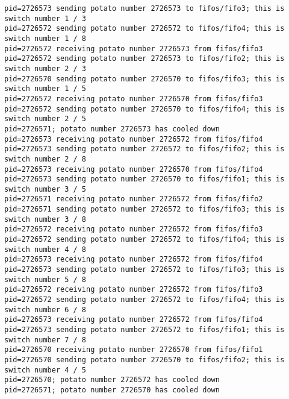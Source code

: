 \documentclass[a4paper]{article}
\begin{document}
\begin{verbatim}
pid=2726573 sending potato number 2726573 to fifos/fifo3; this is switch number 1 / 3
pid=2726572 sending potato number 2726572 to fifos/fifo4; this is switch number 1 / 8
pid=2726572 receiving potato number 2726573 from fifos/fifo3
pid=2726572 sending potato number 2726573 to fifos/fifo2; this is switch number 2 / 3
pid=2726570 sending potato number 2726570 to fifos/fifo3; this is switch number 1 / 5
pid=2726572 receiving potato number 2726570 from fifos/fifo3
pid=2726572 sending potato number 2726570 to fifos/fifo4; this is switch number 2 / 5
pid=2726571; potato number 2726573 has cooled down
pid=2726573 receiving potato number 2726572 from fifos/fifo4
pid=2726573 sending potato number 2726572 to fifos/fifo2; this is switch number 2 / 8
pid=2726573 receiving potato number 2726570 from fifos/fifo4
pid=2726573 sending potato number 2726570 to fifos/fifo1; this is switch number 3 / 5
pid=2726571 receiving potato number 2726572 from fifos/fifo2
pid=2726571 sending potato number 2726572 to fifos/fifo3; this is switch number 3 / 8
pid=2726572 receiving potato number 2726572 from fifos/fifo3
pid=2726572 sending potato number 2726572 to fifos/fifo4; this is switch number 4 / 8
pid=2726573 receiving potato number 2726572 from fifos/fifo4
pid=2726573 sending potato number 2726572 to fifos/fifo3; this is switch number 5 / 8
pid=2726572 receiving potato number 2726572 from fifos/fifo3
pid=2726572 sending potato number 2726572 to fifos/fifo4; this is switch number 6 / 8
pid=2726573 receiving potato number 2726572 from fifos/fifo4
pid=2726573 sending potato number 2726572 to fifos/fifo1; this is switch number 7 / 8
pid=2726570 receiving potato number 2726570 from fifos/fifo1
pid=2726570 sending potato number 2726570 to fifos/fifo2; this is switch number 4 / 5
pid=2726570; potato number 2726572 has cooled down
pid=2726571; potato number 2726570 has cooled down
\end{verbatim}
\end{document}
